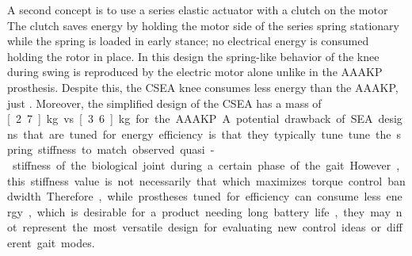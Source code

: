 A second concept is to use a series elastic actuator with a clutch on the motor
\citep{rouse2014clutchable, rouse2015design} The clutch saves energy by holding
the motor side of the series spring stationary while the spring is loaded in
early stance; no electrical energy is consumed holding the rotor in place. In
this design the spring-like behavior of the knee during swing is reproduced by
the electric motor alone unlike in the AAAKP prosthesis. Despite this, the
CSEA knee consumes less energy than the AAAKP, just .
Moreover, the simplified design of the CSEA has a mass of \unit[2.7]{kg} vs
\unit[3.6]{kg} for the AAAKP.

A potential drawback of SEA designs that are tuned for energy efficiency is that
they typically tune tune the spring stiffness to match observed quasi-stiffness
of the biological joint during a certain phase of the gait. However, this
stiffness value is not necessarily that which maximizes torque control
bandwidth. Therefore, while prostheses tuned for efficiency can consume less
energy, which is desirable for a product needing long battery life, they may
not represent the most versatile design for evaluating new control ideas or
different gait modes. 
